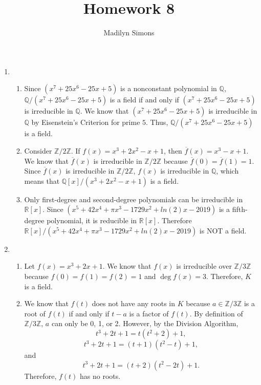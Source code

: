 \documentclass{article}
\title{Homework 8}
\author{Madilyn Simons}
\date{}
\begin{document}
\maketitle

\begin{enumerate}

\item
\begin{enumerate}

\item Since $(x^7 + 25x^6 - 25x + 5)$ is a nonconstant polynomial in
$\mathbb{Q}$, $\mathbb{Q}/(x^7 + 25x^6 - 25x + 5)$ is a field if and only if
$(x^7 + 25x^6 - 25x + 5)$ is irreducible in $\mathbb{Q}$.  We know that
$(x^7 + 25x^6 - 25x + 5)$ is irreducible in $\mathbb{Q}$ by Eisenstein's
Criterion for prime $5$.  Thus, $\mathbb{Q}/(x^7 + 25x^6 - 25x + 5)$ is a field.

\item Consider $\mathbb{Z}/2\mathbb{Z}$.  If $f(x) = x^3 + 2x^2 - x + 1$, then
$\overline{f}(x) = x^3 - x + 1$.  We know that $\overline{f}(x)$ is
irreducible in $\mathbb{Z}/2\mathbb{Z}$ because
$\overline{f}(0) = \overline{f}(1) = 1$.  Since $\overline{f}(x)$ is
irreducible in $\mathbb{Z}/2\mathbb{Z}$, $f(x)$ is irreducible in $\mathbb{Q}$,
which means that $\mathbb{Q}[x]/(x^3 + 2x^2 - x + 1)$ is a field.

\item Only first-degree and second-degree polynomials can be irreducible in
$\mathbb{R}[x]$.  Since $(x^5 + 42x^4 + \pi x^3 -1729x^2 + ln(2)x - 2019)$
is a fifth-degree polynomial, it is reducible in $\mathbb{R}[x]$.  Therefore
$\mathbb{R}[x]/(x^5 + 42x^4 + \pi x^3 -1729x^2 + ln(2)x - 2019)$ is NOT
a field.

\end{enumerate}

\item
\begin{enumerate}
\item
Let $f(x) = x^3 + 2x + 1$.  We know that $f(x)$ is irreducible over
$\mathbb{Z}/3\mathbb{Z}$ because $f(0) = f(1) = f(2) = 1$ and $\deg f(x) = 3$.
Therefore,
$K$ is a field.
\item
We know that $f(t)$ does not have any roots in $K$ because $a \in \mathbb{Z}/3\mathbb{Z}$
is a root of $f(t)$ if and only if $t-a$ is a factor of $f(t)$.  By definition of
$\mathbb{Z}/3\mathbb{Z}$, $a$ can only be 0, 1, or 2.  However, by the Division
Algorithm,
\[
t^3 + 2t + 1 = t(t^2 + 2) + 1,
\]
\[
t^3 + 2t + 1 = (t+1)(t^2 - t) + 1,
\]
and
\[
t^3 + 2t + 1 = (t+2)(t^2 - 2t) + 1.
\]
Therefore, $f(t)$ has no roots.


\end{enumerate}
\end{enumerate}
\end{document}
